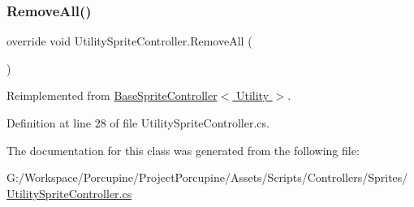 \subsubsection{\texorpdfstring{Remove\+All()}{RemoveAll()}}
{\footnotesize\ttfamily override void Utility\+Sprite\+Controller.\+Remove\+All (\begin{DoxyParamCaption}{ }\end{DoxyParamCaption})\hspace{0.3cm}{\ttfamily [virtual]}}



Reimplemented from \hyperlink{class_base_sprite_controller_ae1fdf8c0abb1e362257540f2de80d6dc}{Base\+Sprite\+Controller$<$ Utility $>$}.



Definition at line 28 of file Utility\+Sprite\+Controller.\+cs.



The documentation for this class was generated from the following file\+:\begin{DoxyCompactItemize}
\item 
G\+:/\+Workspace/\+Porcupine/\+Project\+Porcupine/\+Assets/\+Scripts/\+Controllers/\+Sprites/\hyperlink{_utility_sprite_controller_8cs}{Utility\+Sprite\+Controller.\+cs}\end{DoxyCompactItemize}
